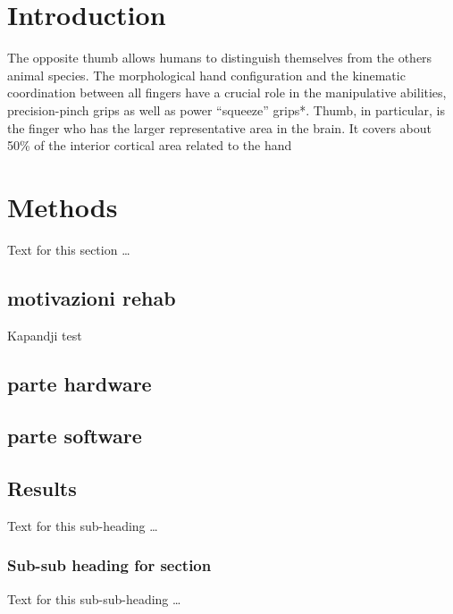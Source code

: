 \documentclass{bmcart}
\begin{document}


\section*{Introduction}

The opposite thumb allows humans to distinguish themselves from the others animal species. The morphological hand configuration and the kinematic coordination between all fingers have a crucial role in the manipulative abilities, precision-pinch grips as well as power “squeeze” grips*. Thumb, in particular, is the finger who has the larger representative area in the brain. It covers about 50\% of the interior cortical area related to the hand \cite{weidner1992tumor}
\cite{oreg}


\section*{Methods}
Text for this section \ldots
\subsection*{motivazioni rehab}
Kapandji test 
\subsection*{parte hardware}
\subsection*{parte software}

\subsection*{Results}
Text for this sub-heading \ldots
\subsubsection*{Sub-sub heading for section}
Text for this sub-sub-heading \ldots

\end{document}
